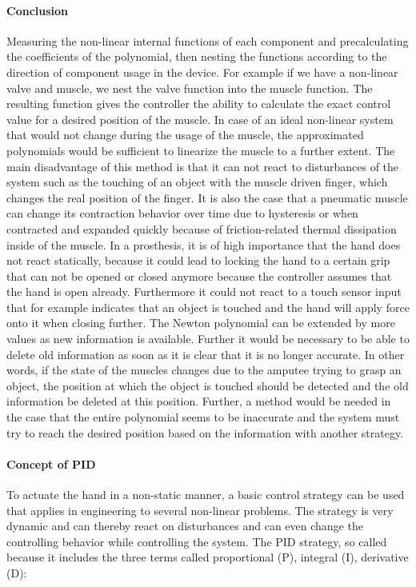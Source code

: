 \documentclass[main]{subfiles}
\begin{document}
\paragraph{Conclusion}
Measuring the non-linear internal functions of each component and precalculating the coefficients of the polynomial, then nesting the functions according to the direction of component usage in the device. For example if we have a non-linear valve and muscle, we nest the valve function into the muscle function. The resulting function gives the controller the ability to calculate the exact control value for a desired position of the muscle. In case of an ideal non-linear system that would not change during the usage of the muscle, the approximated polynomials would be sufficient to linearize the muscle to a further extent. The main disadvantage of this method is that it can not react to disturbances of the system such as the touching of an object with the muscle driven finger, which changes the real position of the finger. It is also the case that a pneumatic muscle can change its contraction behavior over time due to hysteresis or when contracted and expanded quickly because of friction-related thermal dissipation inside of the muscle. In a prosthesis, it is of high importance that the hand does not react statically, because it could lead to locking the hand to a certain grip that can not be opened or closed anymore because the controller assumes that the hand is open already. Furthermore it could not react to a touch sensor input that for example indicates that an object is touched and the hand will apply force onto it when closing further. The Newton polynomial can be extended by more values as new information is available. Further it would be necessary to be able to delete old information as soon as it is clear that it is no longer accurate. In other words, if the state of the muscles changes due to the amputee trying to grasp an object, the position at which the object is touched should be detected and the old information be deleted at this position. Further, a method would be needed in the case that the entire polynomial seems to be inaccurate and the system must try to reach the desired position based on the information with another strategy.

\paragraph{Concept of PID}
To actuate the hand in a non-static manner, a basic control strategy can be used that applies in engineering to several non-linear problems. The strategy is very dynamic and can thereby react on disturbances and can even change the controlling behavior while controlling the system. The PID strategy, so called because it includes the three terms called proportional (P), integral (I), derivative (D):
\end{document}
